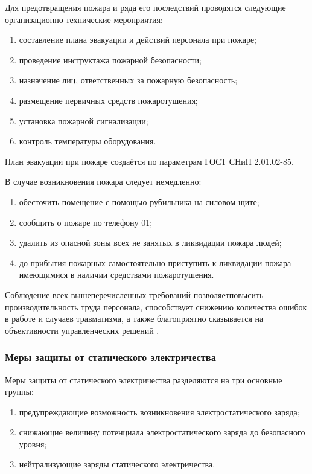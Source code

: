 Для предотвращения пожара и ряда его последствий проводятся следующие организационно-технические мероприятия:
\begin{enumerate}
\item составление плана эвакуации и действий персонала при пожаре;
\item проведение инструктажа пожарной безопасности;
\item назначение лиц, ответственных за пожарную безопасность;
\item размещение первичных средств пожаротушения;
\item установка пожарной сигнализации;
\item контроль температуры оборудования.
\end{enumerate}

План эвакуации при пожаре создаётся по параметрам ГОСТ СНиП 2.01.02-85.

В случае возникновения пожара следует немедленно:
\begin{enumerate}
\item обесточить помещение с помощью рубильника на силовом щите;
\item сообщить о пожаре по телефону 01;
\item удалить из опасной зоны всех не занятых в ликвидации пожара людей;
\item до прибытия пожарных самостоятельно приступить к ликвидации пожара имеющимися в наличии средствами пожаротушения.
\end{enumerate}

Соблюдение всех вышеперечисленных требований позволяетповысить производительность труда персонала, способствует снижению количества ошибок в работе и случаев травматизма, а также благоприятно сказывается на объективности управленческих решений \cite{bhzd_1}.

\subsubsection{Меры защиты от статического электричества}

Меры защиты от статического электричества разделяются на три основные группы:
\begin{enumerate}
\item предупреждающие возможность возникновения электростатического заряда;
\item снижающие величину потенциала электростатического заряда до безопасного уровня;
\item нейтрализующие заряды статического электричества.
\end{enumerate}

